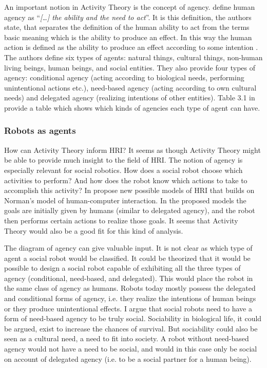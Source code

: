An important notion in Activity Theory is the concept of agency. \textcite[][37]{Kaptelinin2012} define human agency as ``\textit{[\dots] the ability and the need to act}''. It is this definition, the authors state, that separates the definition of the human ability to act from the terms basic meaning which is the ability to produce an effect. In this way the human action is defined as the ability to produce an effect according to some intention \cite{Kaptelinin2012}. The authors define six types of agents: natural things, cultural things, non-human living beings, human beings, and social entities. They also provide four types of agency: conditional agency (acting according to biological needs, performing unintentional actions etc.), need-based agency (acting according to own cultural needs) and delegated agency (realizing intentions of other entities). Table 3.1 in  provide a table which shows which kinds of agencies each type of agent can have.

\subsubsection{Robots as agents}

How can Activity Theory inform HRI? It seems as though Activity Theory might be able to provide much insight to the field of HRI. The notion of agency is especially relevant for social robotics. How does a social robot choose which activities to perform? And how does the robot know which actions to take to accomplish this activity? In  \textcite{Scholtz2003robot} propose new possible models of HRI that builds on Norman's model of human-computer interaction. In the proposed models the goals are initially given by humans (similar to delegated agency), and the robot then performs certain actions to realize those goals. It seems that Activity Theory would also be a good fit for this kind of analysis. 

The diagram of agency \parencite{Kaptelinin2012} can give valuable input. It is not clear as which type of agent a social robot would be classified. It could be theorized that it would be possible to design a social robot capable of exhibiting all the three types of agency (conditional, need-based, and delegated). This would place the robot in the same class of agency as humans. Robots today mostly possess the delegated and conditional forms of agency, i.e. they realize the intentions of human beings or they produce unintentional effects. I argue that social robots need to have a form of need-based agency to be truly social. Sociability in biological life, it could be argued, exist to increase the chances of survival. But sociability could also be seen as a cultural need, a need to fit into society. A robot without need-based agency would not have a need to be social, and would in this case only be social on account of delegated agency (i.e. to be a social partner for a human being).

